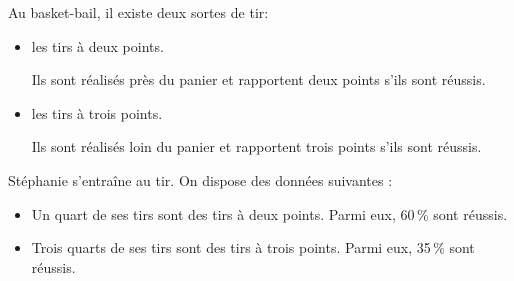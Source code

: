 Au basket-bail, il existe deux sortes de tir:

\begin{itemize}
	\item les tirs à deux points.
	
	\hspace{4mm}Ils sont réalisés près du panier et rapportent deux points s'ils sont réussis.
	\item les tirs à trois points.
	
	\hspace{4mm}Ils sont réalisés loin du panier et rapportent trois points s'ils sont réussis.
\end{itemize}

Stéphanie s'entraîne au tir. On dispose des données suivantes :

\begin{itemize}
	\item Un quart de ses tirs sont des tirs à deux points. Parmi eux, 60\,\% sont réussis.
	\item Trois quarts de ses tirs sont des tirs à trois points. Parmi eux, 35\,\% sont réussis.
\end{itemize}

